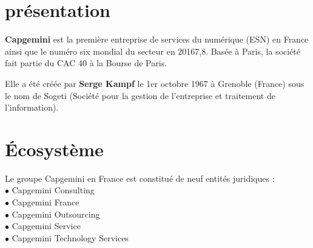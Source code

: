 \documentclass[a4paper, 12pt,french,oneside]{book}%
\theoremstyle{definition}
\theoremstyle{remark}
\begin{document}
\section{présentation}
\textbf{Capgemini} est la première entreprise de services du numérique (ESN) en France ainsi que le numéro six mondial du secteur en 20167,8. Basée à Paris, la société fait partie du CAC 40 à la Bourse de Paris.

Elle a été créée par\textbf{ Serge Kampf }le 1er octobre 1967 à Grenoble (France) sous le nom de Sogeti (Société pour la gestion de l'entreprise et traitement de l'information).
\section{Écosystème}
Le groupe Capgemini en France est constitué de neuf entités juridiques :\\
$\bullet$ Capgemini Consulting\\
$\bullet$ Capgemini France\\
$\bullet$ Capgemini Outsourcing\\
$\bullet$ Capgemini Service\\
$\bullet$ Capgemini Technology Services\\
\end{document}

